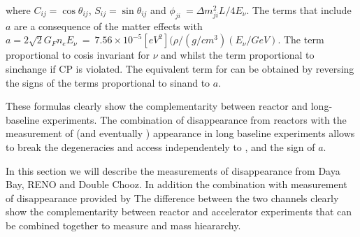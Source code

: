where $C_{ij} = \cos \theta_{ij}$, $S_{ij} = \sin \theta_{ij}$ and $\phi_{ji}~= \Delta m^2_{ji} L / 4 E_{\nu}$. The terms that include $a$ are a consequence of the matter effects with $a=2\sqrt 2 G_F n_e E_{\nu}~=~7.56\times10^{-5} [eV^2](\rho/(g/cm^3)(E_{\nu}/GeV)$. The term proportional to cos\dcp is invariant for $\nu$ and \nub whilst the term proportional to sin\dcp change if CP is violated. 
The equivalent term for \pappb can be obtained by reversing the signs of the terms proportional to sin\dcp and to $a$. 

These formulas clearly show the complementarity between reactor and long-baseline experiments. The combination of \nueb disappearance from reactors with the measurement of \nue (and eventually \nueb) appearance in long baseline experiments allows to break the degeneracies and access independentely to \thint, \dcp and the sign of $a$.

In this section we will describe the measurements of \nueb disappearance from Daya Bay, RENO and Double Chooz. In addition the combination with measurement of \nueb disappearance provided by The difference between the two channels clearly show the complementarity between reactor and accelerator experiments that can be combined together to measure \dcp and mass hieararchy.
